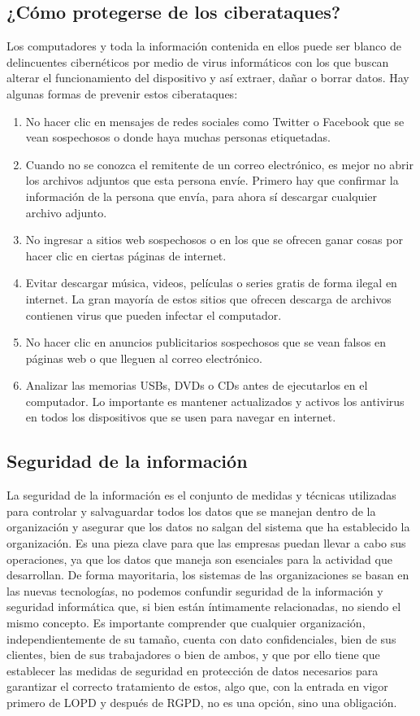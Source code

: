 \documentclass[12pt]{article}
\begin{document}
\subsection*{¿Cómo protegerse de los ciberataques?}
Los computadores y toda la información contenida en ellos puede ser blanco de delincuentes cibernéticos por medio de virus informáticos con los que buscan alterar el funcionamiento del dispositivo y así extraer, dañar o borrar datos.
Hay algunas formas de prevenir estos ciberataques:

\begin{enumerate}
\item No hacer clic en mensajes de redes sociales como Twitter o Facebook que se vean sospechosos o donde haya muchas personas etiquetadas.
\item Cuando no se conozca el remitente de un correo electrónico, es mejor no abrir los archivos adjuntos que esta persona envíe. Primero hay que confirmar la información de la persona que envía, para ahora sí descargar cualquier archivo adjunto.
\item No ingresar a sitios web sospechosos o en los que se ofrecen ganar cosas por hacer clic en ciertas páginas de internet.
\item Evitar descargar música, videos, películas o series gratis de forma ilegal en internet. La gran mayoría de estos sitios que ofrecen descarga de archivos contienen virus que pueden infectar el computador.
\item No hacer clic en anuncios publicitarios sospechosos que se vean falsos en páginas web o que lleguen al correo electrónico.
\item Analizar las memorias USBs, DVDs o CDs antes de ejecutarlos en el computador. Lo importante es mantener actualizados y activos los antivirus en todos los dispositivos que se usen para navegar en internet.
\end{enumerate}

\subsection*{Seguridad de la información}
La seguridad de la información es el conjunto de medidas y técnicas utilizadas para controlar y salvaguardar todos los datos que se manejan dentro de la organización y asegurar que los datos no salgan del sistema que ha establecido la organización. Es una pieza clave para que las empresas puedan llevar a cabo sus operaciones, ya que los datos que maneja son esenciales para la actividad que desarrollan.
De forma mayoritaria, los sistemas de las organizaciones se basan en las nuevas tecnologías, no podemos confundir seguridad de la información y seguridad informática que, si bien están íntimamente relacionadas, no siendo el mismo concepto.
Es importante comprender que cualquier organización, independientemente de su tamaño, cuenta con dato confidenciales, bien de sus clientes, bien de sus trabajadores o bien de ambos, y que por ello tiene que establecer las medidas de seguridad en protección de datos necesarios para garantizar el correcto tratamiento de estos, algo que, con la entrada en vigor primero de LOPD y después de RGPD, no es una opción, sino una obligación.
\end{document}
